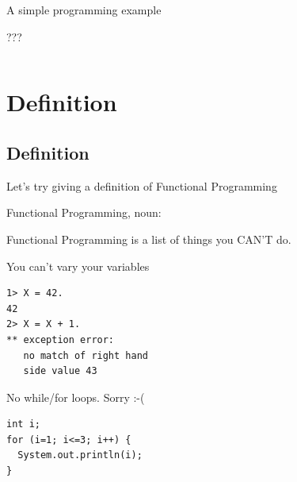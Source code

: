 \documentclass[mathserif]{beamer}
\begin{document}
\begin{frame}{A simple programming example}

  \begin{center}
    {\Huge ???}
  \end{center}

  \vskip5mm

  \inputminted[firstline=3,lastline=9,gobble=4]{java}{code/java/DoubleAllIterative.java}

\end{frame}

\section{Definition}
\subsection{Definition}

\begin{frame}

    {\Huge
      Let's try giving a definition of Functional Programming
    }

\end{frame}

\begin{frame}{Functional Programming, noun:}

  \begin{exampleblock}{}
    {\Huge
      Functional Programming is a list of things you CAN’T do.
      }
    \vskip5mm
    \hspace*{}
  \end{exampleblock}
\end{frame}


\begin{frame}[fragile]{You can't vary your variables}
  \begin{verbatim}
1> X = 42.
42
2> X = X + 1.
** exception error:
   no match of right hand
   side value 43
  \end{verbatim}
\end{frame}

\begin{frame}[fragile]{No while/for loops. Sorry :-(}
  \begin{verbatim}
int i;
for (i=1; i<=3; i++) {
  System.out.println(i);
}
  \end{verbatim}
\end{frame}
\end{document}

